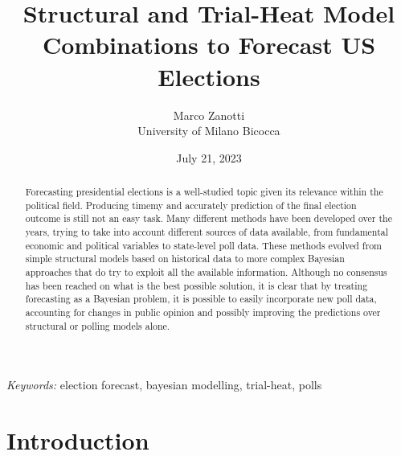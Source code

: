 \documentclass[
  12pt]{article}
\begin{document}
\def\spacingset#1{\renewcommand{\baselinestretch}%
{#1}\small\normalsize} \spacingset{1}



\date{July 21, 2023}
\title{\bf Structural and Trial-Heat Model Combinations to Forecast US
Elections}
\author{
Marco Zanotti\\
University of Milano Bicocca\\
}
\maketitle

\bigskip
\bigskip
\begin{abstract}
Forecasting presidential elections is a well-studied topic given its
relevance within the political field. Producing timemy and accurately
prediction of the final election outcome is still not an easy task. Many
different methods have been developed over the years, trying to take
into account different sources of data available, from fundamental
economic and political variables to state-level poll data. These methods
evolved from simple structural models based on historical data to more
complex Bayesian approaches that do try to exploit all the available
information. Although no consensus has been reached on what is the best
possible solution, it is clear that by treating forecasting as a
Bayesian problem, it is possible to easily incorporate new poll data,
accounting for changes in public opinion and possibly improving the
predictions over structural or polling models alone.
\end{abstract}

\noindent%
{\it Keywords:} election forecast, bayesian modelling, trial-heat, polls
\vfill

\newpage
\spacingset{1.9} %
\ifdefined\Shaded\renewenvironment{Shaded}{\begin{tcolorbox}[enhanced, frame hidden, boxrule=0pt, sharp corners, interior hidden, breakable, borderline west={3pt}{0pt}{shadecolor}]}{\end{tcolorbox}}\fi

\hypertarget{sec-intro}{%
\section{Introduction}\label{sec-intro}}
\end{document}
